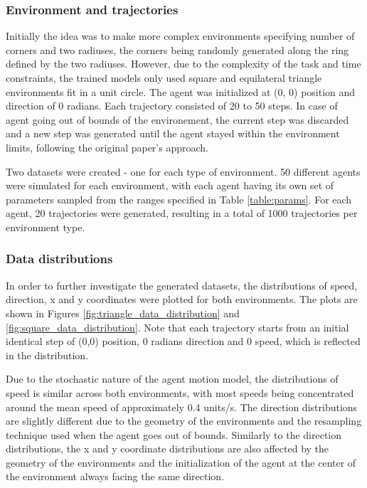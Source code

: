 \documentclass{article}
\begin{document}
\subsubsection{Environment and trajectories}
Initially the idea was to make more complex environments specifying number of corners and two radiuses, the corners being randomly generated along the ring defined by the two radiuses. However, due to the complexity of the task and time constraints, the trained models only used square and equilateral triangle environments fit in a unit circle. The agent was initialized at (0, 0) position and direction of 0 radians. Each trajectory consisted of 20 to 50 steps.  In case of agent going out of bounds of the environement, the current step was discarded and a new step was generated until the agent stayed within the environment limits, following the original paper's approach. 

Two datasets were created - one for each type of environment. 50 different agents were simulated for each environment, with each agent having its own set of parameters sampled from the ranges specified in Table \ref{table:params}. For each agent, 20 trajectories were generated, resulting in a total of 1000 trajectories per environment type. 

\subsubsection{Data distributions}
In order to further investigate the generated datasets, the distributions of speed, direction, x and y coordinates were plotted for both environments. The plots are shown in Figures \ref{fig:triangle_data_distribution} and \ref{fig:square_data_distribution}. Note that each trajectory starts from an initial identical step of (0,0) position, 0 radians direction and 0 speed, which is reflected in the distribution.

Due to the stochastic nature of the agent motion model, the distributions of speed is similar across both environments, with most speeds being concentrated around the mean speed of approximately 0.4 units/s. The direction distributions are slightly different due to the geometry of the environments and the resampling technique used when the agent goes out of bounds. Similarly to the direction distributions, the x and y coordinate distributions are also affected by the geometry of the environments and the initialization of the agent at the center of the environment always facing the same direction. 
\end{document}
